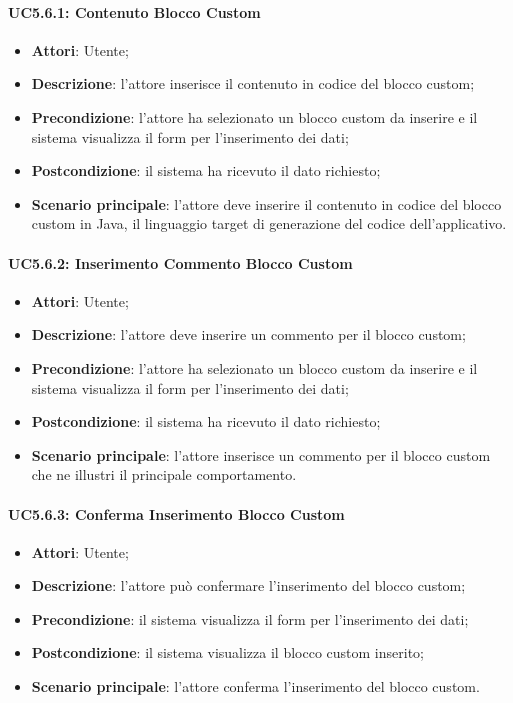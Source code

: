 \paragraph{UC5.6.1: Contenuto Blocco Custom}
\label{UC5.6.1}
\begin{itemize}
	\item \textbf{Attori}: Utente;
	\item \textbf{Descrizione}: l'attore inserisce il contenuto in codice del blocco custom;
	\item \textbf{Precondizione}: l'attore ha selezionato un blocco custom da inserire e il sistema visualizza il form per l'inserimento dei dati;
	\item \textbf{Postcondizione}: il sistema ha ricevuto il dato richiesto;
	\item \textbf{Scenario principale}: l'attore deve inserire il contenuto in codice del blocco custom in Java, il linguaggio target di generazione del codice dell'applicativo.
\end{itemize}

\paragraph{UC5.6.2: Inserimento Commento Blocco Custom}
\label{UC5.6.2}
\begin{itemize}
	\item \textbf{Attori}: Utente;
	\item \textbf{Descrizione}: l'attore deve inserire un commento per il blocco custom;
	\item \textbf{Precondizione}: l'attore ha selezionato un blocco custom da inserire e il sistema visualizza il form per l'inserimento dei dati;
	\item \textbf{Postcondizione}: il sistema ha ricevuto il dato richiesto;
	\item \textbf{Scenario principale}: l'attore inserisce un commento per il blocco custom che ne illustri il principale comportamento.
\end{itemize}

\paragraph{UC5.6.3: Conferma Inserimento Blocco Custom}
\label{UC5.6.3}
\begin{itemize}
	\item \textbf{Attori}: Utente;
	\item \textbf{Descrizione}: l'attore può confermare l'inserimento del blocco custom;
	\item \textbf{Precondizione}: il sistema visualizza il form per l'inserimento dei dati;
	\item \textbf{Postcondizione}: il sistema visualizza il blocco custom inserito;
	\item \textbf{Scenario principale}: l'attore conferma l'inserimento del blocco custom.
\end{itemize}

